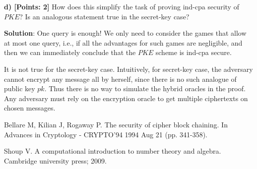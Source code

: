 \documentclass[12pt]{article}
\theoremstyle{definition}
\begin{document}
{\bf d) [Points: 2]} How does this simplify the task of proving ind-cpa security of $PKE$? Is an
analogous statement true in the secret-key case?

{\bf Solution}: One query is enough! We only need to consider the games that allow at most one query, i.e., if all the advantages for such games are negligible, and then we can immediately conclude that the $PKE$ scheme is ind-cpa secure.

It is not true for the secret-key case. Intuitively, for secret-key case, the adversary cannot encrypt any message all by herself, since there is no such analogue of public key $pk$. Thus there is no way to simulate the hybrid oracles in the proof. Any adversary must rely on the encryption oracle to get multiple ciphertexts on chosen messages.

\begin{thebibliography}{10}
Bellare M, Kilian J, Rogaway P. The security of cipher block chaining. In Advances in Cryptology - CRYPTO’94 1994 Aug 21 (pp. 341-358).

Shoup V. A computational introduction to number theory and algebra. Cambridge university press; 2009.
\end{thebibliography}
\end{document}

